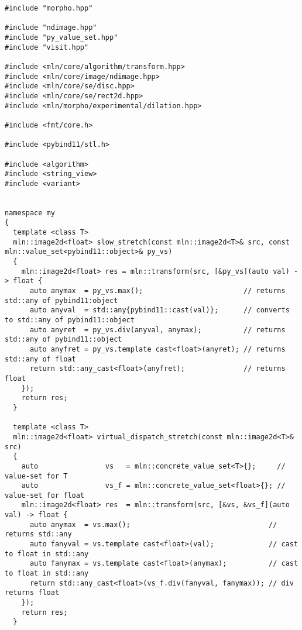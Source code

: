 \begin{verbatim}
#include "morpho.hpp"

#include "ndimage.hpp"
#include "py_value_set.hpp"
#include "visit.hpp"

#include <mln/core/algorithm/transform.hpp>
#include <mln/core/image/ndimage.hpp>
#include <mln/core/se/disc.hpp>
#include <mln/core/se/rect2d.hpp>
#include <mln/morpho/experimental/dilation.hpp>

#include <fmt/core.h>

#include <pybind11/stl.h>

#include <algorithm>
#include <string_view>
#include <variant>


namespace my
{
  template <class T>
  mln::image2d<float> slow_stretch(const mln::image2d<T>& src, const mln::value_set<pybind11::object>& py_vs)
  {
    mln::image2d<float> res = mln::transform(src, [&py_vs](auto val) -> float {
      auto anymax  = py_vs.max();                        // returns std::any of pybind11:object
      auto anyval  = std::any{pybind11::cast(val)};      // converts to std::any of pybind11::object
      auto anyret  = py_vs.div(anyval, anymax);          // returns std::any of pybind11::object
      auto anyfret = py_vs.template cast<float>(anyret); // returns std::any of float
      return std::any_cast<float>(anyfret);              // returns float
    });
    return res;
  }

  template <class T>
  mln::image2d<float> virtual_dispatch_stretch(const mln::image2d<T>& src)
  {
    auto                vs   = mln::concrete_value_set<T>{};     // value-set for T
    auto                vs_f = mln::concrete_value_set<float>{}; // value-set for float
    mln::image2d<float> res  = mln::transform(src, [&vs, &vs_f](auto val) -> float {
      auto anymax  = vs.max();                                 // returns std::any
      auto fanyval = vs.template cast<float>(val);             // cast to float in std::any
      auto fanymax = vs.template cast<float>(anymax);          // cast to float in std::any
      return std::any_cast<float>(vs_f.div(fanyval, fanymax)); // div returns float
    });
    return res;
  }


\end{verbatim}
